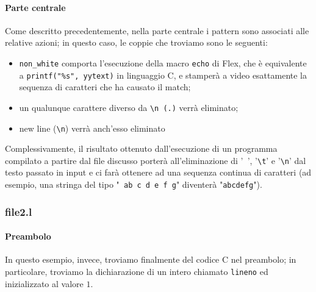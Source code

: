 \documentclass[class=book, crop=false, oneside, 12pt]{standalone}
\begin{document}
\paragraph{Parte centrale}
Come descritto precedentemente, nella parte centrale i pattern sono associati alle relative azioni; in questo caso, le coppie che troviamo sono le seguenti:
\begin{itemize}
    \item \texttt{non\_white} comporta l'esecuzione della macro \texttt{echo} di Flex, che è equivalente a \texttt{printf("\%s", yytext)} in linguaggio C, e stamperà a video esattamente la sequenza di caratteri che ha causato il match;
    \item un qualunque carattere diverso da \texttt{\textbackslash n (.)} verrà eliminato;
    \item new line (\texttt{\textbackslash n}) verrà anch'esso eliminato
\end{itemize}

Complessivamente, il risultato ottenuto dall'esecuzione di un programma compilato a partire dal file discusso porterà all'eliminazione di '\texttt{ }', '\texttt{\textbackslash t}' e '\texttt{\textbackslash n}' dal testo passato in input e ci farà ottenere ad una sequenza continua di caratteri (ad esempio, una stringa del tipo "\texttt{ ab c d e \hspace{.8cm} f g}" diventerà "\texttt{abcdefg}").

\subsubsection{file2.l}



\paragraph{Preambolo}
In questo esempio, invece, troviamo finalmente del codice C nel preambolo; in particolare, troviamo la dichiarazione di un intero chiamato \texttt{lineno} ed inizializzato al valore \(1\). 
\end{document}
